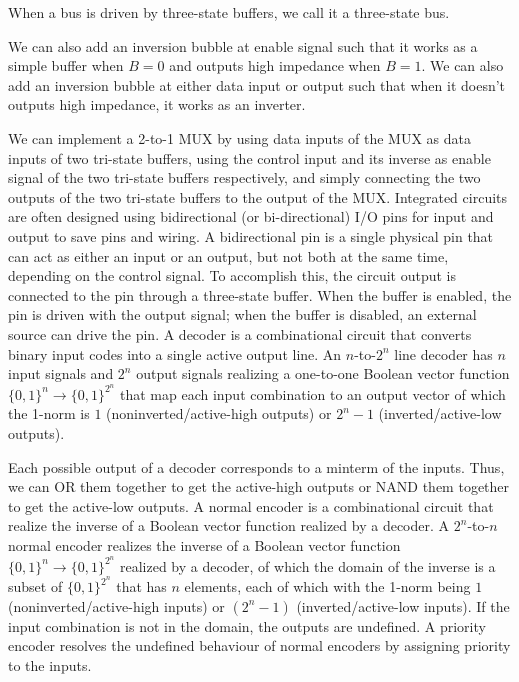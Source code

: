 \documentclass[a4paper,12pt]{article}
\begin{document}
\begin{itemize}
\begin{itemize}
\begin{itemize}
\begin{itemize}
\begin{itemize}
\begin{itemize}
\begin{itemize}
When a bus is driven by three-state buffers, we call it a three-state bus.

We can also add an inversion bubble at enable signal such that it works as a simple buffer when $B=0$ and outputs high impedance when $B=1$. We can also add an inversion bubble at either data input or output such that when it doesn't outputs high impedance, it works as an inverter.

We can implement a 2-to-1 MUX by using data inputs of the MUX as data inputs of two tri-state buffers, using the control input and its inverse as enable signal of the two tri-state buffers respectively, and simply connecting the two outputs of the two tri-state buffers to the output of the MUX.
Integrated circuits are often designed using bidirectional (or bi-directional) I/O pins for input and output to save pins and wiring. A bidirectional pin is a single physical pin that can act as either an input or an output, but not both at the same time, depending on the control signal. To accomplish this, the circuit output is connected to the pin through a three-state buffer. When the buffer is enabled, the pin is driven with the output signal; when the buffer is disabled, an external source can drive the pin.
A decoder is a combinational circuit that converts binary input codes into a single active output line. An $n$-to-$2^n$ line decoder has $n$ input signals and $2^n$ output signals realizing a one-to-one Boolean vector function $\{0,1\}^n\to\{0,1\}^{2^n}$ that map each input combination to an output vector of which the 1-norm is $1$ (noninverted/active-high outputs) or $2^n-1$ (inverted/active-low outputs).

Each possible output of a decoder corresponds to a minterm of the inputs. Thus, we can OR them together to get the active-high outputs or NAND them together to get the active-low outputs.
A normal encoder is a combinational circuit that realize the inverse of a Boolean vector function realized by a decoder. A $2^n$-to-$n$ normal encoder realizes the inverse of a Boolean vector function $\{0,1\}^n\to\{0,1\}^{2^n}$ realized by a decoder, of which the domain of the inverse is a subset of $\{0,1\}^{2^n}$ that has $n$ elements, each of which with the 1-norm being $1$ (noninverted/active-high inputs) or $(2^n-1)$ (inverted/active-low inputs). If the input combination is not in the domain, the outputs are undefined.
A priority encoder resolves the undefined behaviour of normal encoders by assigning priority to the inputs.


\end{itemize}
\end{itemize}
\end{itemize}
\end{itemize}
\end{itemize}
\end{itemize}
\end{itemize}
\end{document}
